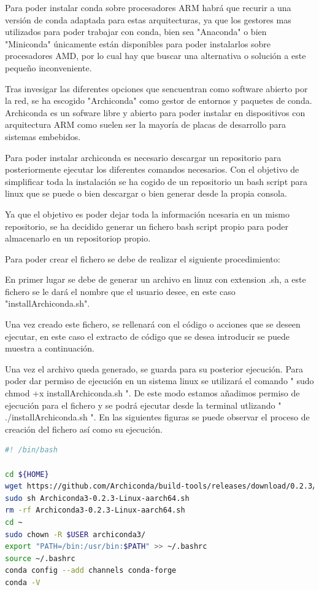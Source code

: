 Para poder instalar conda sobre procesadores ARM habrá que recurir a una versión de conda adaptada para estas arquitecturas, ya que los gestores mas utilizados para poder trabajar con conda, bien sea "Anaconda" o bien "Miniconda" únicamente están disponibles para poder instalarlos sobre procesadores AMD, por lo cual hay que buscar una alternativa o solución a este pequeño inconveniente.

Tras invesigar las diferentes opciones que sencuentran como software abierto por la red, se ha escogido "Archiconda" como gestor de entornos y paquetes de conda. Archiconda es un sofware libre y abierto para poder instalar en dispositivos con arquitectura ARM como suelen ser la mayoría de placas de desarrollo para sistemas embebidos.

Para poder instalar archiconda es necesario descargar un repositorio para posteriormente ejecutar los diferentes comandos necesarios. Con el objetivo de simplificar toda la instalación se ha cogido de un repositorio un bash script para linux que se puede o bien descargar o bien generar desde la propia consola.

Ya que el objetivo es poder dejar toda la información ncesaria en un mismo repositorio, se ha decidido generar un fichero bash script propio para poder almacenarlo en un repositoriop propio.

Para poder crear el fichero se debe de realizar el siguiente procedimiento:

En primer lugar se debe de generar un archivo en linuz con extension .sh, a este fichero se le dará el nombre que el usuario desee, en este caso "installArchiconda.sh".

Una vez creado este fichero, se rellenará con el código o acciones que se deseen ejecutar, en este caso el extracto de código que se desea introducir se puede muestra a continuación.

Una vez el archivo queda generado, se guarda para su posterior ejecución. Para poder dar permiso de ejecución en un sistema linux se utilizará el comando " sudo chmod +x installArchiconda.sh ". De este modo estamos añadimos permiso de ejecución para el fichero y se podrá ejecutar desde la terminal utlizando " ./installArchiconda.sh ". En las siguientes figuras se puede observar el proceso de creación del fichero así como su ejecución.

\begin{lstlisting}[language=bash, caption={Código bash}, label={cod:bash}, captionpos=b]
#! /bin/bash

cd ${HOME}
wget https://github.com/Archiconda/build-tools/releases/download/0.2.3/Archiconda3-0.2.3-Linux-aarch64.sh
sudo sh Archiconda3-0.2.3-Linux-aarch64.sh
rm -rf Archiconda3-0.2.3-Linux-aarch64.sh
cd ~
sudo chown -R $USER archiconda3/
export "PATH=/bin:/usr/bin:$PATH" >> ~/.bashrc 
source ~/.bashrc
conda config --add channels conda-forge
conda -V

\end{lstlisting}


